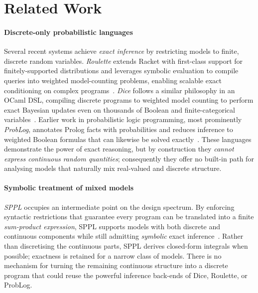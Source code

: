 \section{Related Work}
\label{sec:related}

\paragraph{Discrete-only probabilistic languages}  
Several recent systems achieve \emph{exact inference} by restricting models to finite, discrete random variables. \emph{Roulette} extends Racket with first-class support for finitely-supported distributions and leverages symbolic evaluation to compile queries into weighted model-counting problems, enabling scalable exact conditioning on complex programs~\cite{Moy2025Roulette}. \emph{Dice} follows a similar philosophy in an OCaml DSL, compiling discrete programs to weighted model counting to perform exact Bayesian updates even on thousands of Boolean and finite-categorical variables~\cite{Holtzen2020Dice}. Earlier work in probabilistic logic programming, most prominently \emph{ProbLog}, annotates Prolog facts with probabilities and reduces inference to weighted Boolean formulas that can likewise be solved exactly~\cite{DeRaedt2007ProbLog}. These languages demonstrate the power of exact reasoning, but by construction they \emph{cannot express continuous random quantities}; consequently they offer no built-in path for analysing models that naturally mix real-valued and discrete structure.  

\paragraph{Symbolic treatment of mixed models}  
\emph{SPPL} occupies an intermediate point on the design spectrum. By enforcing syntactic restrictions that guarantee every program can be translated into a finite \emph{sum-product expression}, SPPL supports models with both discrete and continuous components while still admitting \emph{symbolic} exact inference~\cite{Saad2021SPPL}. Rather than discretising the continuous parts, SPPL derives closed-form integrals when possible; exactness is retained for a narrow class of models. There is no mechanism for turning the remaining continuous structure into a discrete program that could reuse the powerful inference back-ends of Dice, Roulette, or ProbLog.

